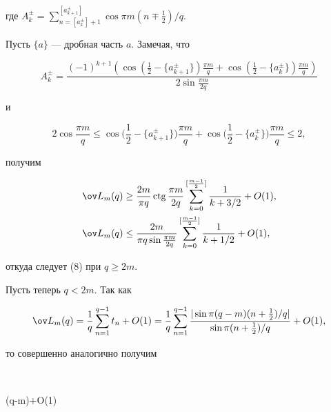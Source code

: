 где $A^\pm_k=\sum\limits^{[a^\pm_{k+1}]}_{n=[a^\pm_k]+1} \cos \pi 


m(n\mp\frac{1}{2})/q$. 


 


Пусть $\{a\}$ --- дробная часть $a$. Замечая, что 


$$ 


A^\pm_k=\frac{(-1)^{k+1}(\cos(\frac{1}{2}-\{a^\pm_{k+1}\}) 


\frac{\pi m}{q}+\cos(\frac{1}{2}-\{a^\pm_k\})\frac{\pi m}{q})} 


{2\sin\frac{\pi m}{2q}} 


$$ 


и 


$$ 


2\cos\frac{\pi m}{q}\le\cos\bigg(\frac{1}{2}-\{a^\pm_{k+1}\}\bigg) 


\frac{\pi m}{q}+\cos\bigg(\frac{1}{2}-\{a^\pm_k\}\bigg) 


\frac{\pi m}{q}\le2, 


$$ 


получим 


\begin{align*} 


\ov L_m(q)&\ge\frac{2m}{\pi q}\ctg\frac{\pi m}{2q} 


\sum^{[\frac{m-1}{2}]}_{k=0}\frac{1}{k+3/2}+O(1),\\ 


% 


\ov L_m(q)&\le\frac{2m}{\pi q\sin\frac{\pi m}{2q}} 


\sum^{[\frac{m-1}{2}]}_{k=0}\frac{1}{k+1/2}+O(1), 


\end{align*} 


откуда следует (8) при $q\ge2m$. 


 


Пусть теперь $q<2m$. Так как 


$$ 


\ov L_m(q)=\frac{1}{q}\sum^{q-1}_{n=1}t_n+O(1)=\frac{1}{q} 


\sum^{q-1}_{n=1}\frac{|\sin\pi(q-m)(n+\frac{1}{2})/q|} 


{\sin\pi(n+\frac{1}{2})/q}+O(1), 


$$ 


то совершенно аналогично получим 


$$


\ctg{}\ln(q-m)+O(1)\le 


